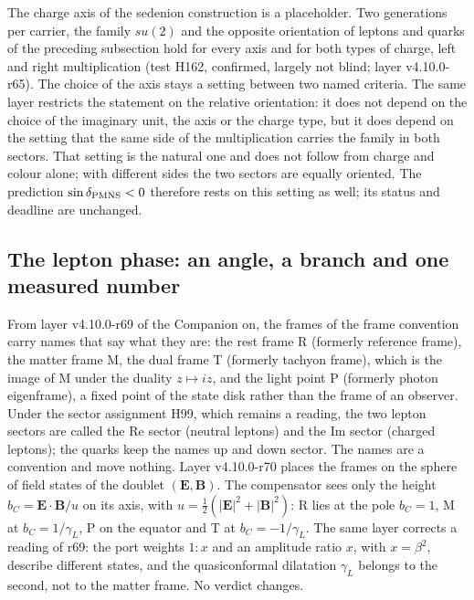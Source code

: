 The charge axis of the sedenion construction is a placeholder. Two
generations per carrier, the family $su(2)$ and the opposite
orientation of leptons and quarks of the preceding subsection hold for
every axis and for both types of charge, left and right multiplication
(test H162, confirmed, largely not blind; layer v4.10.0-r65). The
choice of the axis stays a setting between two named criteria. The
same layer restricts the statement on the relative orientation: it
does not depend on the choice of the imaginary unit, the axis or the
charge type, but it does depend on the setting that the same side of
the multiplication carries the family in both sectors. That setting is
the natural one and does not follow from charge and colour alone; with
different sides the two sectors are equally oriented. The prediction
$\sin\delta_{\rm PMNS}<0$ therefore rests on this setting as well; its
status and deadline are unchanged.

\subsection{The lepton phase: an angle, a branch and one measured number}

From layer v4.10.0-r69 of the Companion on, the frames of the frame
convention carry names that say what they are: the rest frame R
(formerly reference frame), the matter frame M, the dual frame T
(formerly tachyon frame), which is the image of M under the duality
$z\mapsto iz$, and the light point P (formerly photon eigenframe), a
fixed point of the state disk rather than the frame of an observer.
Under the sector assignment H99, which remains a reading, the two
lepton sectors are called the Re sector (neutral leptons) and the Im
sector (charged leptons); the quarks keep the names up and down sector.
The names are a convention and move nothing. Layer v4.10.0-r70 places
the frames on the sphere of field states of the doublet
$(\mathbf E,\mathbf B)$. The compensator sees only the height
$b_C=\mathbf E\cdot\mathbf B/u$ on its axis, with
$u=\tfrac12(|\mathbf E|^2+|\mathbf B|^2)$: R lies at the pole $b_C=1$,
M at $b_C=1/\gamma_L$, P on the equator and T at $b_C=-1/\gamma_L$. The
same layer corrects a reading of r69: the port weights $1:x$ and an
amplitude ratio $x$, with $x=\beta^2$, describe different states, and the
quasiconformal dilatation $\gamma_L$ belongs to the second, not to the
matter frame. No verdict changes.

